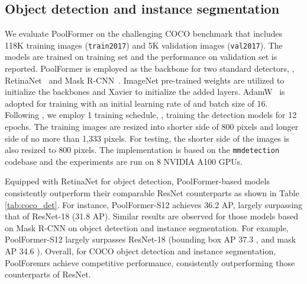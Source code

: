 \subsection{Object detection and instance segmentation}
\vspace{-1pt}
 We evaluate PoolFormer on the challenging COCO benchmark \cite{coco} that includes 118K training images (\texttt{train2017}) and 5K validation images (\texttt{val2017}). The models are trained on training set and the performance on validation set is reported. PoolFormer is employed as the backbone for two standard detectors, \ie, RetinaNet~\cite{retinanet} and Mask R-CNN~\cite{mask_rcnn}. ImageNet pre-trained weights are utilized to initialize the backbones and Xavier \cite{glorot2010understanding} to initialize the added layers. AdamW~\cite{adam, adamw}  is adopted for training with an initial learning rate of  and batch size of 16. Following \cite{retinanet, mask_rcnn}, we employ 1 training schedule, \ie, training the detection models for 12 epochs. The training images are resized into shorter side of 800 pixels and longer side of no more than 1,333 pixels. For testing, the shorter side of the images is also resized to 800 pixels. The implementation is based on the \texttt{mmdetection} \cite{mmdetection} codebase and the experiments are run on 8 NVIDIA A100 GPUs. 

Equipped with RetinaNet for object detection, PoolFormer-based models consistently outperform their comparable ResNet counterparts as shown in Table \ref{tab:coco_det}. For instance, PoolFormer-S12 achieves 36.2 AP, largely surpassing that of ResNet-18 (31.8 AP). 
Similar results are observed for those models based on Mask R-CNN on object detection and instance segmentation. For example, PoolFormer-S12 largely surpasses ResNet-18 (bounding box AP 37.3 , and mask AP 34.6 ). 
Overall, for COCO object detection and instance segmentation, PoolForemrs achieve competitive performance, consistently outperforming those counterparts of ResNet. 


